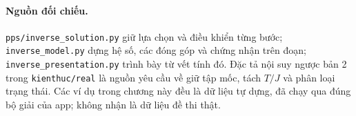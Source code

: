 \paragraph{Nguồn đối chiếu.} \texttt{pps/inverse\_solution.py} giữ lựa chọn và điều khiển từng bước; \texttt{inverse\_model.py} dựng hệ số, các đóng góp và chứng nhận trên đoạn; \texttt{inverse\_presentation.py} trình bày từ vết tính đó. Đặc tả nội suy ngược bản 2 trong \texttt{kienthuc/real} là nguồn yêu cầu về giữ tập mốc, tách $T/J$ và phân loại trạng thái. Các ví dụ trong chương này đều là dữ liệu tự dựng, đã chạy qua đúng bộ giải của app; không nhận là dữ liệu đề thi thật.
